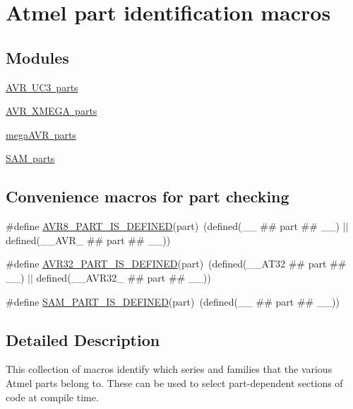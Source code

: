 \hypertarget{group__part__macros__group}{}\section{Atmel part identification macros}
\label{group__part__macros__group}
\subsection*{Modules}
\begin{DoxyCompactItemize}
\item 
\mbox{\hyperlink{group__uc3__part__macros__group}{A\+V\+R U\+C3 parts}}
\item 
\mbox{\hyperlink{group__xmega__part__macros__group}{A\+V\+R X\+M\+E\+G\+A parts}}
\item 
\mbox{\hyperlink{group__mega__part__macros__group}{mega\+A\+V\+R parts}}
\item 
\mbox{\hyperlink{group__sam__part__macros__group}{S\+A\+M parts}}
\end{DoxyCompactItemize}
\subsection*{Convenience macros for part checking}
\begin{DoxyCompactItemize}
\item 
\#define \mbox{\hyperlink{group__part__macros__group_ga2fb54ec8ba6d98af5ed21dfb4ec97483}{A\+V\+R8\+\_\+\+P\+A\+R\+T\+\_\+\+I\+S\+\_\+\+D\+E\+F\+I\+N\+ED}}(part)~(defined(\+\_\+\+\_\+ \#\# part \#\# \+\_\+\+\_\+) $\vert$$\vert$ defined(\+\_\+\+\_\+\+A\+V\+R\+\_\+ \#\# part \#\# \+\_\+\+\_\+))
\item 
\#define \mbox{\hyperlink{group__part__macros__group_gac253d1a424ff2bc355184e3cdb93514d}{A\+V\+R32\+\_\+\+P\+A\+R\+T\+\_\+\+I\+S\+\_\+\+D\+E\+F\+I\+N\+ED}}(part)~(defined(\+\_\+\+\_\+\+A\+T32 \#\# part \#\# \+\_\+\+\_\+) $\vert$$\vert$ defined(\+\_\+\+\_\+\+A\+V\+R32\+\_\+ \#\# part \#\# \+\_\+\+\_\+))
\item 
\#define \mbox{\hyperlink{group__part__macros__group_ga50580478fd56bb842e0cbdd354a6933c}{S\+A\+M\+\_\+\+P\+A\+R\+T\+\_\+\+I\+S\+\_\+\+D\+E\+F\+I\+N\+ED}}(part)~(defined(\+\_\+\+\_\+ \#\# part \#\# \+\_\+\+\_\+))
\end{DoxyCompactItemize}


\subsection{Detailed Description}
This collection of macros identify which series and families that the various Atmel parts belong to. These can be used to select part-\/dependent sections of code at compile time. 

